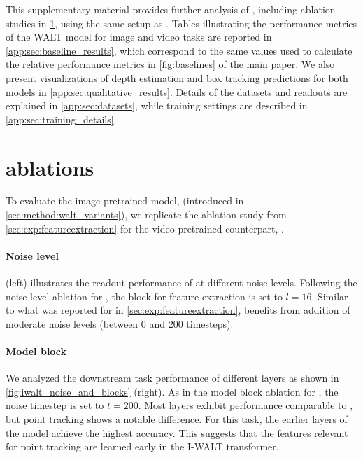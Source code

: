 
This supplementary material provides further analysis of \iwalt, including ablation studies in \cref{app:sec:iwalt_ablations}, using the same setup as \vwalt. Tables illustrating the performance metrics of the WALT model for image and video tasks are reported in \cref{app:sec:baseline_results}, which correspond to the same values used to calculate the relative performance metrics in \cref{fig:baselines} of the main paper. We also present visualizations of depth estimation and box tracking predictions for both models in \cref{app:sec:qualitative_results}. Details of the datasets and readouts are explained in \cref{app:sec:datasets}, while training settings are described in \cref{app:sec:training_details}.


\section{\iwalt ablations}
\label{app:sec:iwalt_ablations}


To evaluate the image-pretrained model, \iwalt (introduced in \cref{sec:method:walt_variants}), we replicate the ablation study from \cref{sec:exp:featureextraction} for the video-pretrained counterpart, \vwalt.




\paragraph{Noise level}
 (left) illustrates the readout performance of \iwalt at different noise levels.  Following the noise level ablation for \vwalt, the block for feature extraction is set to $l=16$. Similar to what was reported for \vwalt in \cref{sec:exp:featureextraction},  \iwalt benefits from addition of moderate noise levels (between 0 and 200 timesteps).

\paragraph{Model block}
We analyzed the downstream task performance of different layers as shown in \cref{fig:iwalt_noise_and_blocks} (right). As in the model block ablation for \vwalt, the noise timestep is set to $t=200$. Most layers exhibit performance comparable to \vwalt, but point tracking shows a notable difference.  For this task, the earlier layers of the model achieve the highest accuracy. This suggests that the features relevant for point tracking are learned early in the I-WALT transformer.

